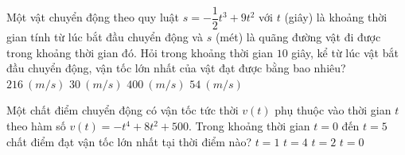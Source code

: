 \begin{ex}%
	Một vật chuyển động theo quy luật $s = -\dfrac{1}{2}t^3 + 9t^2$ với $t$ (giây) là khoảng thời gian tính từ lúc bắt đầu chuyển động và $s$ (mét) là quãng đường vật đi được trong khoảng thời gian đó. Hỏi trong khoảng thời gian $10$ giây, kể từ lúc vật bắt đầu  chuyển động, vận tốc lớn nhất của vật đạt được bằng bao nhiêu?
	 \choice
		{$216~\left(m/s  \right)$}
		{$30~\left(m/s \right)$} 
		{$400~\left(m/s \right)$} 
		{\True $54~\left(m/s  \right)$}
\end{ex}

\begin{ex}%
	Một chất điểm chuyển động có vận tốc tức thời $v(t)$ phụ thuộc vào thời  gian $t$ theo hàm số $v(t)=-t^4+8t^2+500$. Trong khoảng thời gian $t=0$ đến $t=5$ chất điểm đạt vận tốc lớn nhất tại thời điểm nào?
	 \choice
		 {$t=1$}
		 {$t=4$}
		{\True $t=2$} 
		 {$t=0$}
\end{ex}

